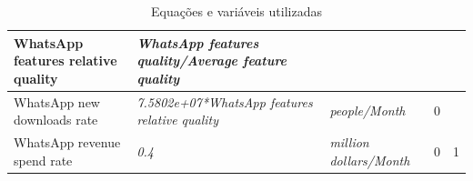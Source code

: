 \begin{table}[h]
\begin{adjustbox}{width=1\textwidth}
\begin{tabular}{|l|l|l|l|l|}
   WhatsApp features relative quality & \textit{WhatsApp features quality/Average feature quality} &  &  &  \\\hline
   WhatsApp new downloads rate & \textit{7.5802e+07*WhatsApp features relative quality} & \textit{people/Month} & 0 &  \\\hline
   WhatsApp revenue spend rate & \textit{0.4} & \textit{million dollars/Month} & 0 & 1 \\
   \hline
   \end{tabular}
   \label{tab:variables}
   \end{adjustbox}
   \caption{Equações e variáveis utilizadas}
\end{table}
